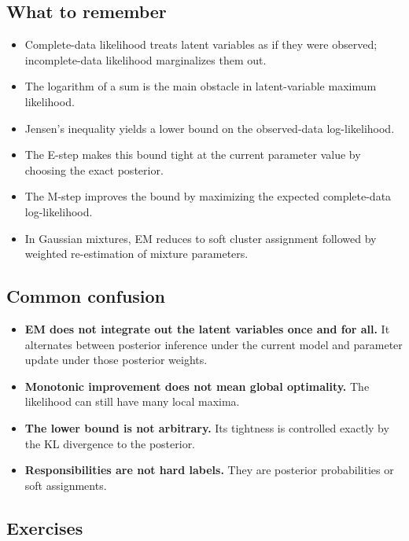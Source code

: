 \subsection*{What to remember}

\begin{itemize}
    \item Complete-data likelihood treats latent variables as if they were observed; incomplete-data likelihood marginalizes them out.
    \item The logarithm of a sum is the main obstacle in latent-variable maximum likelihood.
    \item Jensen's inequality yields a lower bound on the observed-data log-likelihood.
    \item The E-step makes this bound tight at the current parameter value by choosing the exact posterior.
    \item The M-step improves the bound by maximizing the expected complete-data log-likelihood.
    \item In Gaussian mixtures, EM reduces to soft cluster assignment followed by weighted re-estimation of mixture parameters.
\end{itemize}

\subsection*{Common confusion}

\begin{itemize}
    \item \textbf{EM does not integrate out the latent variables once and for all.} It alternates between posterior inference under the current model and parameter update under those posterior weights.
    \item \textbf{Monotonic improvement does not mean global optimality.} The likelihood can still have many local maxima.
    \item \textbf{The lower bound is not arbitrary.} Its tightness is controlled exactly by the KL divergence to the posterior.
    \item \textbf{Responsibilities are not hard labels.} They are posterior probabilities or soft assignments.
\end{itemize}

\subsection*{Exercises}

